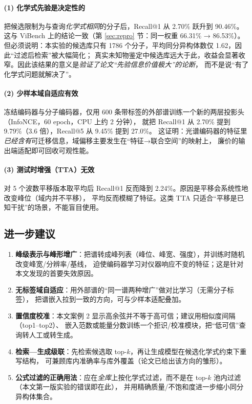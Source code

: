 \documentclass[UTF8,a4paper,11pt]{ctexart}
\begin{document}
\paragraph{(1) 化学式先验是决定性的}
把候选限制为与查询\emph{化学式相同}的分子后，Recall@1 从 2.70\% 跃升到 90.46\%。
这与 ViBench 上的结论一致（第 \ref{sec:repro} 节：同一权重 66.31\% → 86.53\%）。
但必须说明：本实验的候选库只有 1786 个分子，平均同分异构体数仅 1.62，因此“过滤后检索”被大幅简化；
真实未知物鉴定中候选库远大于此，收益会显著收窄。因此该结果的意义是\emph{验证了论文“先验信息价值极大”的论断}，
而不是说“有了化学式问题就解决了”。

\paragraph{(2) 少样本域自适应有效}
冻结编码器与分子编码器，仅用 600 条带标签的外部谱训练一个新的两层投影头（InfoNCE，60 epoch，CPU 上约 2 分钟），
就把 Recall@1 从 2.70\% 提到 9.79\%（3.6 倍），Recall@5 从 9.45\% 提到 27.0\%。
这证明：光谱编码器的特征里\emph{已经含有}可迁移信息，域偏移主要发生在“特征→联合空间”的映射上，
廉价的输出端适配即可回收可观性能。

\paragraph{(3) 测试时增强（TTA）无效}
对 5 个波数平移版本取平均后 Recall@1 反而降到 2.24\%。原因是平移会系统性地改变峰位（域内并不平移），
平均反而模糊了特征。这类 TTA 只适合“平移是已知干扰”的场景，不能盲目使用。

\subsection{进一步建议}
\begin{enumerate}[leftmargin=1.4em,itemsep=2pt]
\item \textbf{峰级表示与峰形增广}：把谱转成峰列表（峰位、峰宽、强度），并训练时随机改变峰宽/分辨率/基线，
     迫使编码器学习对仪器响应不变的特征；这是针对本文发现的首要失效原因。
\item \textbf{无标签域自适应}：用外部谱的“同一谱两种增广”做对比学习（无需分子标签），
     把谱嵌入拉到一致的方向，可与少样本适配叠加。
\item \textbf{置信度校准}：本文案例 2 显示高余弦并不等于高可信；建议用相似度间隔（top1--top2）、
     嵌入范数或能量分数训练一个拒识/校准模块，把“低可信”查询转人工或转生成。
\item \textbf{检索—生成级联}：先检索候选取 top-$k$，再让生成模型在候选化学式约束下重写结构，
     可兼顾库内准确率与库外覆盖（论文已给出该方向的雏形）。
\item \textbf{公式过滤的正确用法}：应在\emph{全库}上按化学式过滤，而不是在 top-$k$ 池内过滤（本文第一版实验的错误即在此），
     并用精确质量/不饱和度进一步缩小同分异构体集合。
\end{enumerate}
\end{document}
